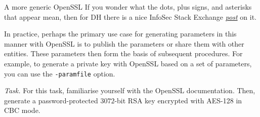 \documentclass{practice}
\begin{document}
\begin{task}{A more generic OpenSSL}
  If you wonder what the dots, plus signs, and asterisks that appear mean, then for DH there is a nice InfoSec Stack Exchange \href{https://security.stackexchange.com/a/140639}{\textit{post}} on it.

  In practice, perhaps the primary use case for generating parameters in this manner with OpenSSL is to publish the parameters or share them with other entities.
  These parameters then form the basis of subsequent procedures.
  For example, to generate a private key with OpenSSL based on a set of parameters, you can use the \texttt{-paramfile} option.

  \textit{Task.}
  For this task, familiarise yourself with the OpenSSL documentation.
  Then, generate a password-protected $3072$-bit RSA key encrypted with AES-128 in CBC mode.
\end{task}
\end{document}
